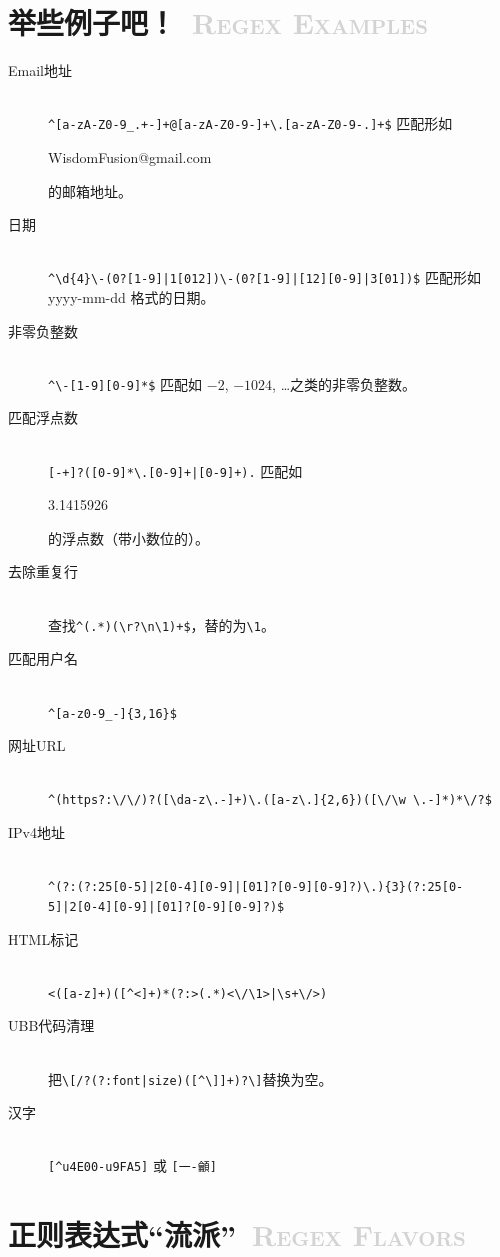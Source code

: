 \documentclass[12pt,a4paper,twoside]{ctexart}
\newcommand{\cbmatch}[1]{\colorbox{cyan!35}{\strut #1}}
\begin{document}
\section[举些例子吧！]{举些例子吧！~\textcolor{lightgray}{\textsc{Regex Examples}}}
\label{sec:regex-examples}

\begin{description}
\item[Email地址] \hfill \\
  \verb=^[a-zA-Z0-9_.+-]+@[a-zA-Z0-9-]+\.[a-zA-Z0-9-.]+$= 匹配形如 \cbmatch{WisdomFusion@gmail.com} 的邮箱地址。
\item[日期] \hfill \\
  \verb=^\d{4}\-(0?[1-9]|1[012])\-(0?[1-9]|[12][0-9]|3[01])$= 匹配形如 yyyy-mm-dd 格式的日期。
\item[非零负整数] \hfill \\
  \verb=^\-[1-9][0-9]*$= 匹配如 $-2$, $-1024$, \ldots 之类的非零负整数。
\item[匹配浮点数] \hfill \\
  \verb=[-+]?([0-9]*\.[0-9]+|[0-9]+).= 匹配如 \cbmatch{3.1415926} 的浮点数（带小数位的）{}。
\item[去除重复行] \hfill \\
  查找\verb=^(.*)(\r?\n\1)+$=，替的为\verb"\1"。
\item[匹配用户名] \hfill \\
  \verb=^[a-z0-9_-]{3,16}$=
\item[网址URL] \hfill \\
  \verb=^(https?:\/\/)?([\da-z\.-]+)\.([a-z\.]{2,6})([\/\w \.-]*)*\/?$=
\item[IPv4地址] \hfill \\
  \verb=^(?:(?:25[0-5]|2[0-4][0-9]|[01]?[0-9][0-9]?)\.){3}(?:25[0-5]|2[0-4][0-9]|[01]?[0-9][0-9]?)$=
\item[HTML标记] \hfill \\
  \verb=<([a-z]+)([^<]+)*(?:>(.*)<\/\1>|\s+\/>)=
\item[UBB代码清理] \hfill \\
  把\verb=\[/?(?:font|size)([^\]]+)?\]=替换为空。
\item[汉字] \hfill \\
  \verb=[^u4E00-u9FA5]= 或 \verb=[一-龥]=
\end{description}

\section[正则表达式“流派”]{正则表达式“流派”~\textcolor{lightgray}{\textsc{Regex Flavors}}}
\label{sec:flavor}
\end{document}
